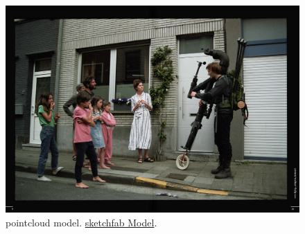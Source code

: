 \documentclass{article}
\newcommand\x{12.7}
\begin{document}
\begin{figure}[H]
  \centering
  \captionsetup{font=small,justification=raggedright,singlelinecheck=false}
  \includegraphics[width=\x cm]{a.jpg}
  \caption{pointcloud model. \href{https://sketchfab.com/3d-models/wifi-workspace-visualisation-aefe16a1f9bd4296941e099754eaacc2}{sketchfab Model}.}
  \label{fig:method}
\end{figure}
\end{document}
